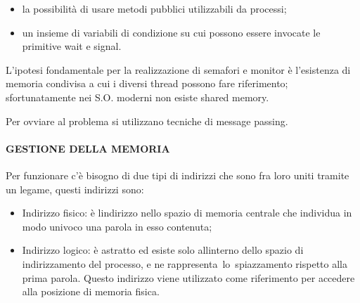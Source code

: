 \documentclass[
]{article}
\providecommand{\tightlist}{%
  \setlength{\itemsep}{0pt}\setlength{\parskip}{0pt}}
\begin{document}
{}

\begin{itemize}
\tightlist
\item
  {la possibilità di usare metodi pubblici utilizzabili da processi;}
\end{itemize}

{}

\begin{itemize}
\tightlist
\item
  {un insieme di variabili di condizione su cui possono essere invocate
  le primitive wait e signal.}
\end{itemize}

{}

{L'ipotesi fondamentale per la realizzazione di semafori e monitor è
l'esistenza di memoria condivisa a cui i diversi thread possono fare
riferimento; sfortunatamente nei S.O. moderni non esiste shared memory.}

{Per ovviare al problema si utilizzano tecniche di message passing.}

{}

{}

\paragraph{\texorpdfstring{{GESTIONE DELLA
MEMORIA}}{GESTIONE DELLA MEMORIA}}\label{h.u452h5khjm3z}

{Per funzionare c'è bisogno di due tipi di indirizzi che sono fra loro
uniti tramite un legame, questi indirizzi sono:}

{}

\begin{itemize}
\tightlist
\item
  {Indirizzo fisico: è l\textquotesingle indirizzo nello spazio di
  memoria centrale che individua in modo univoco una parola in esso
  contenuta;}
\end{itemize}

{}

\begin{itemize}
\tightlist
\item
  {Indirizzo logico: è astratto ed esiste solo
  all\textquotesingle interno dello spazio di indirizzamento del
  processo, e ne rappresenta}{~lo}{~spiazzamento rispetto alla prima
  parola. }{Questo indirizzo viene utilizzato come riferimento per
  accedere alla posizione di memoria fisica}{.}
\end{itemize}

{}
\end{document}
